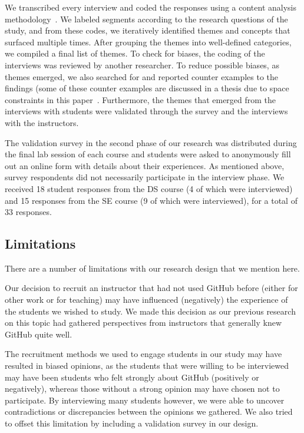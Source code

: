 We transcribed every interview and coded the responses using a content analysis methodology~\cite{charmaz2006constructing}.
We labeled segments according to the research questions of the study, and from these codes, we iteratively identified themes and concepts that surfaced multiple times. After grouping the themes into well-defined categories, we compiled a final list of themes. To check for biases, the coding of the interviews was reviewed by another researcher. To reduce possible biases, as themes emerged, we also searched for and reported counter examples to the findings (some of these counter examples are discussed in a thesis due to space constraints in this paper~\cite{feliciano2015towards}. Furthermore, the themes that emerged from the interviews with students were validated through the survey and the interviews with the instructors.

The validation survey in the second phase of our research was distributed during the final lab session of each course and students were asked to anonymously fill out an online form with details about their experiences. As mentioned above, survey respondents did not necessarily participate in the interview phase. We received 18 student responses from the DS course (4 of which were interviewed) and 15 responses from the SE course (9 of which were interviewed), for a total of 33 responses. 

\subsection{Limitations}
There are a number of limitations with our research design that we mention here. 

Our decision to recruit an instructor that had not used GitHub before (either for other work or for teaching) may have influenced (negatively) the experience of the students we wished to study.  We made this decision as our previous research on this topic had gathered perspectives from instructors that generally knew GitHub quite well. 

The recruitment methods we used to engage students in our study may have resulted in biased opinions, as the students that were willing to be interviewed may have been students who felt strongly about GitHub (positively or negatively), whereas those without a strong opinion may have chosen not to participate. By interviewing many students however, we were able to uncover contradictions or discrepancies between the opinions we gathered. We also tried to offset this limitation by including a validation survey in our design. 


